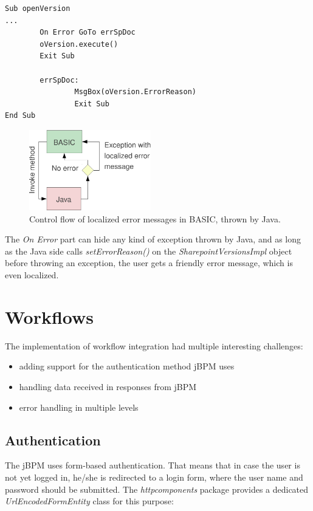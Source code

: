 \begin{lstlisting}
Sub openVersion
...
        On Error GoTo errSpDoc
        oVersion.execute()
        Exit Sub

        errSpDoc:
                MsgBox(oVersion.ErrorReason)
                Exit Sub
End Sub
\end{lstlisting}

\begin{figure}[H]
\centering
\includegraphics[width=200px,keepaspectratio]{basic-l10n.pdf}
\caption{Control flow of localized error messages in BASIC, thrown by Java.}
\label{fig:basic-l10n}
\end{figure}

The \emph{On Error} part can hide any kind of exception thrown by Java, and as
long as the Java side calls \emph{setErrorReason()} on the
\emph{SharepointVersionsImpl} object before throwing an exception, the user gets
a friendly error message, which is even localized.

\section{Workflows}

The implementation of workflow integration had multiple interesting challenges:

\begin{itemize}
\item adding support for the authentication method jBPM uses
\item handling data received in responses from jBPM
\item error handling in multiple levels
\end{itemize}

\subsection{Authentication}

The jBPM uses form-based authentication. That means that in case the user is not
yet logged in, he/she is redirected to a login form, where the user name and
password should be submitted. The \emph{httpcomponents} package provides a
dedicated \emph{UrlEncodedFormEntity} class for this purpose:

